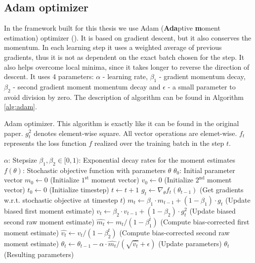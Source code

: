 \subsection{Adam optimizer}
\label{subsec:adam}
In the framework built for this thesis we use Adam (\textbf {Ada}ptive \textbf{m}oment estimation) optimizer (\cite{adam}). It is based on gradient descent, but it also conserves the momentum. In each learning step it uses a weighted average of previous gradients, thus it is not as dependent on the exact batch chosen for the step. It also helps overcome local minima, since it takes longer to reverse the direction of descent. It uses 4 parameters: $\alpha$ - learning rate, $\beta_1$ - gradient momentum decay, $\beta_2$ - second gradient moment momentum decay and $\epsilon$ - a small parameter to avoid division by zero. The description of algorithm can be found in Algorithm \autoref{alg:adam}. 
\begin{algorithm}[h]
\caption{Adam optimizer. This algorithm is exactly like it can be found in the original paper. $g_t^2$ denotes element-wise square. All vector operations are elemet-wise. $f_t$ represents the loss function $f$ realized over the training batch in the step $t$.}
\label{alg:adam}
\begin{algorithmic}
\REQUIRE $\alpha$: Stepsize
\REQUIRE $\beta_1, \beta_2 \in [0,1)$: Exponential decay rates for the moment estimates
\REQUIRE $f(\theta)$: Stochastic objective function with parameters $\theta$
\REQUIRE $\theta_0$: Initial parameter vector
\STATE $m_0 \leftarrow 0$ (Initialize $1^{\text{st}}$ moment vector)
\STATE $v_0 \leftarrow 0$ (Initialize $2^{\text{nd}}$ moment vector)
\STATE $t_0 \leftarrow 0$ (Initialize timestep)
	\STATE $t\leftarrow t+1$
	\STATE $g_t \leftarrow \nabla_\theta f_t(\theta_{t-1})$ (Get gradients w.r.t. stochastic objective at timestep $t$)
	\STATE $m_t\leftarrow \beta_1\cdot m_{t-1}+(1-\beta_1)\cdot g_t$ (Update biased first moment estimate)
	\STATE $v_t\leftarrow \beta_2\cdot v_{t-1}+(1-\beta_2)\cdot g_t^2$ (Update biased second raw moment estimate)
	\STATE $\widehat{m_t}\leftarrow m_t/(1-\beta_1^t)$ (Compute bias-corrected first moment estimate)
	\STATE $\widehat{v_t}\leftarrow v_t/(1-\beta_2^t)$ (Compute bias-corrected second raw moment estimate)
	\STATE $\theta_t\leftarrow\theta_{t-1}-\alpha\cdot \widehat{m_t}/(\sqrt{\widehat{v_t}}+\epsilon)$ (Update parameters)
\ENDWHILE
\RETURN $\theta_t$ (Resulting parameters)
\end{algorithmic}
\end{algorithm}

